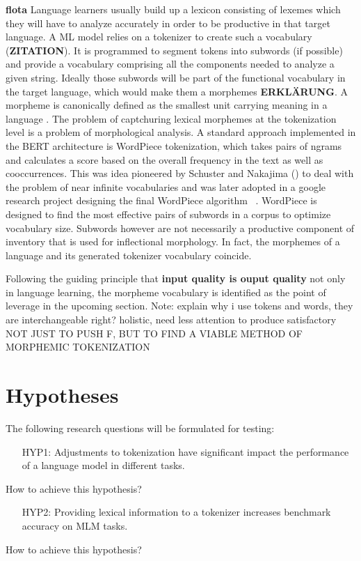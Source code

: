 \textbf{flota} \cite{FLOTA}
Language learners usually build up a lexicon consisting of lexemes which they will have to analyze accurately in order to be productive in that target language.
A ML model relies on a tokenizer to create such a vocabulary  (\textbf{ZITATION}).
It is programmed to segment tokens into subwords (if possible) and provide a vocabulary comprising all the components needed to analyze a given string.
Ideally those subwords will be part of the functional vocabulary in the target language, which would make them a morphemes \textbf{ERKLÄRUNG}.
A morpheme is canonically defined as the smallest unit carrying meaning in a language \cite{morpheme}.
The problem of captchuring lexical morphemes at the tokenization level is a problem of morphological analysis.
A standard approach implemented in the BERT architecture is WordPiece tokenization, which takes pairs of ngrams and calculates a score based on the overall frequency in the text as well as cooccurrences.
This was idea pioneered by Schuster and Nakajima (\citeyear{WORDPIECEOG}) to deal with the problem of near infinite vocabularies and was later adopted in a google research project designing the final WordPiece algorithm ~\cite{WORDPIECEGOOGLE}.
WordPiece is designed to find the most effective pairs of subwords in a corpus to optimize vocabulary size.
Subwords however are not necessarily a productive component of inventory that is used for inflectional morphology.
In fact, the morphemes of a language and its generated tokenizer vocabulary  coincide.


Following the guiding principle that \textbf{input quality is ouput quality} not only in language learning, the morpheme vocabulary is identified as the point of leverage in the upcoming section.
Note: explain why i use tokens and words, they are interchangeable right?
holistic, need less attention to produce satisfactory
\uppercase{not just to push F, but to find a viable method of morphemic tokenization}


\section{Hypotheses}
\label{sec:hypothesis}

The following research questions will be formulated for testing:
\begin{framed}
    \begin{itemize}[itemindent=1em]
        \item[HYP1:] Adjustments to tokenization have significant impact the performance of a language model in different tasks.
    \end{itemize}
\end{framed}
How to achieve this hypothesis?
\begin{framed}
    \begin{itemize}[itemindent=1em]
        \item[HYP2:] Providing lexical information to a tokenizer increases benchmark accuracy on MLM tasks.
    \end{itemize}
\end{framed}
How to achieve this hypothesis?

